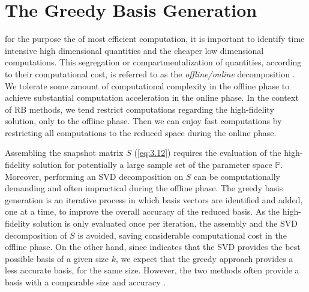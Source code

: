 \section{The Greedy Basis Generation} \label{sec:3.3}
for the purpose the of most efficient computation, it is important to identify time intensive high dimensional quantities and the cheaper low dimensional computations. This segregation or compartmentalization of quantities, according to their computational cost, is referred to as the \emph{offline/online} decomposition \cite{quarteroni2015reduced}. We tolerate some amount of computational complexity in the offline phase to achieve substantial computation acceleration in the online phase. In the context of RB methods, we tend restrict computations regarding the high-fidelity solution, only to the offline phase. Then we can enjoy fast computations by restricting all computations to the reduced space during the online phase.

Assembling the snapshot matrix $S$ (\ref{eq:3.12}) requires the evaluation of the high-fidelity solution for potentially a large sample set of the parameter space $\mathbb P$. Moreover, performing an SVD decomposition on $S$ can be computationally demanding and often impractical during the offline phase. The greedy basis generation is an iterative process in which basis vectors are identified and added, one at a time, to improve the overall accuracy of the reduced basis. As the high-fidelity solution is only evaluated once per iteration, the assembly and the SVD decomposition of $S$ is avoided, saving considerable computational cost in the offline phase. On the other hand, since  indicates that the SVD provides the best possible basis of a given size $k$, we expect that the greedy approach provides a less accurate basis, for the same size. However, the two methods often provide a basis with a comparable size and accuracy \cite{quarteroni2015reduced}.

